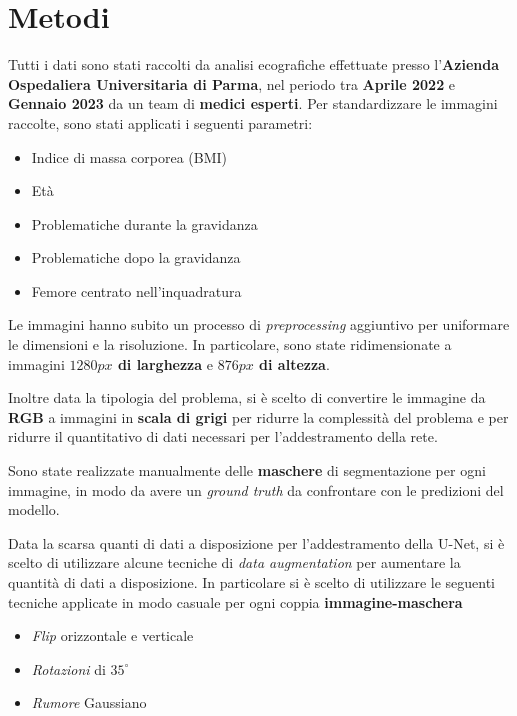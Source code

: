 \chapter{Metodi} %
\label{cha:Metodi}

Tutti i dati sono stati raccolti da analisi ecografiche effettuate presso l'\textbf{Azienda
	Ospedaliera Universitaria di Parma}, nel periodo tra \textbf{Aprile 2022} e \textbf{Gennaio 2023} da
un team di \textbf{medici esperti}. Per standardizzare le immagini raccolte, sono stati applicati i
seguenti parametri:

\begin{itemize}
	\item Indice di massa corporea (BMI)
	\item Età
	\item Problematiche durante la gravidanza
	\item Problematiche dopo la gravidanza
	\item Femore centrato nell'inquadratura
\end{itemize}

Le immagini hanno subito un processo di \textit{preprocessing} aggiuntivo per
uniformare le dimensioni e la risoluzione. In particolare, sono state
ridimensionate a immagini \textbf{$1280px$ di larghezza} e \textbf{$876px$ di
	altezza}.

Inoltre data la tipologia del problema, si è scelto di convertire le immagine da
\textbf{RGB} a immagini in \textbf{scala di grigi} per ridurre la complessità del problema
e per ridurre il quantitativo di dati necessari per l'addestramento della rete.

Sono state realizzate manualmente delle \textbf{maschere} di segmentazione per
ogni immagine, in modo da avere un \textit{ground truth} da confrontare con le
predizioni del modello.

Data la scarsa quanti di dati a disposizione per l'addestramento della U-Net, si è scelto
di utilizzare alcune tecniche di \textit{data augmentation} per aumentare la quantità di
dati a disposizione. In particolare si è scelto di utilizzare le seguenti tecniche
applicate in modo casuale per ogni coppia \textbf{immagine-maschera}
\begin{itemize}
	\item \textit{Flip} orizzontale e verticale
	\item \textit{Rotazioni} di $35^{\circ}$
	\item \textit{Rumore} Gaussiano
\end{itemize}

